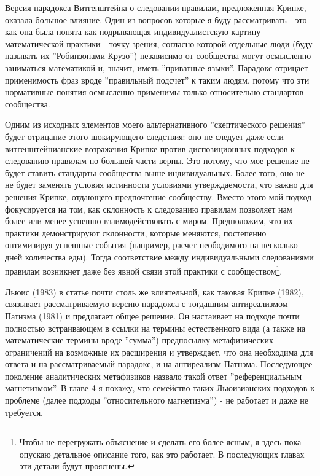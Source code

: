 \documentclass[12pt]{book}
\begin{document}
Версия парадокса Витгенштейна о следовании правилам, предложенная Крипке, оказала большое влияние. Один из вопросов которые я буду рассматривать - это как она была понята как подрывающая индивидуалистскую картину математической практики - точку зрения, согласно которой отдельные люди (буду называть их ''Робинзонами Крузо'') независимо от сообщества могут осмысленно заниматься математикой и, значит, иметь ''приватные языки''. Парадокс отрицает применимость фраз вроде ''правильный подсчет'' к таким людям, потому что эти нормативные понятия осмысленно применимы только относительно стандартов сообщества.

Одним из исходных элементов моего альтернативного ''скептического решения'' будет отрицание этого шокирующего следствия: оно не следует даже если витгенштейнианские возражения Крипке против диспозиционных подходов к следованию правилам по большей части верны. Это потому, что мое решение не будет ставить стандарты сообщества выше индивидуальных. Более того, оно не не будет заменять условия истинности условиями утверждаемости, что важно для решения Крипке, отдающего предпочтение сообществу. Вместо этого мой подход фокусируется на том, как склонность к следованию правилам позволяет нам более или менее успешно взаимодействовать с миром. Предположим, что их практики демонстрируют склонности, которые меняются, постепенно оптимизируя успешные события (например, расчет неободимого на несколько дней количества еды). Тогда соответствие между индивидуальными следованиями правилам возникнет даже без явной связи этой практики с сообществом\footnote{Чтобы не перегружать объяснение и сделать его более ясным, я здесь пока опускаю детальное описание того, как это работает. В последующих главах эти детали будут прояснены.}.

Льюис (1983) в статье почти столь же влиятельной, как таковая Крипке (1982), связывает рассматриваемую версию парадокса с тогдашним антиреализмом Патнэма (1981) и предлагает общее решение. Он настаивает на подходе почти полностью встраивающем в ссылки на термины естественного вида (а также на математические термины вроде ''сумма'') предпосылку метафизических ограничений на возможные их расширения и утверждает, что она необходима для ответа и на рассматриваемый парадокс, и на антиреализм Патнэма. Последующее поколение аналитических метафизиков назвало такой ответ ''референциальным магнетизмом''. В главе 4 я покажу, что семейство таких Льюизианских подходов к проблеме (далее подходы ''относительного магнетизма'') - не работает и даже не требуется.
\end{document}

